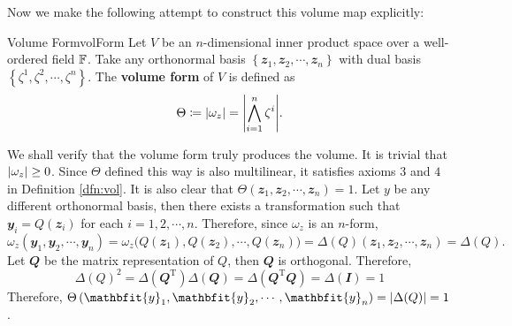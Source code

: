 \documentclass[math]{amznotes}
\theoremstyle{remark}
\newcommand{\I}{\mathbfit{I}}
\begin{document}
Now we make the following attempt to construct this volume map explicitly:
\begin{dfnbox}{Volume Form}{volForm}
    Let $V$ be an $n$-dimensional inner product space over a well-ordered field $\mathbb{F}$. Take any orthonormal basis $\left\{\mathbfit{z}_1, \mathbfit{z}_2, \cdots, \mathbfit{z}_n\right\}$ with dual basis $\left\{\zeta^1, \zeta^2, \cdots, \zeta^n\right\}$. The {\color{red} \textbf{volume form}} of $V$ is defined as 
    \begin{equation*}
        \Theta \coloneqq {\left\lvert {\omega_z} \right\rvert} = {\left\lvert {\bigwedge_{i = 1}^n\zeta^i} \right\rvert}.
    \end{equation*}
\end{dfnbox}
We shall verify that the volume form truly produces the volume. It is trivial that ${\left\lvert {\omega_z} \right\rvert} \geq 0$. Since $\Theta$ defined this way is also multilinear, it satisfies axioms $3$ and $4$ in Definition \ref{dfn:vol}. It is also clear that $\Theta\left(\mathbfit{z}_1, \mathbfit{z}_2, \cdots, \mathbfit{z}_n\right) = 1$. Let $y$ be any different orthonormal basis, then there exists a transformation such that $\mathbfit{y}_i = Q\left(\mathbfit{z}_i\right)$ for each $i = 1, 2, \cdots, n$. Therefore, since $\omega_z$ is an $n$-form,
\begin{equation*}
    \omega_z\left(\mathbfit{y}_1, \mathbfit{y}_2, \cdots, \mathbfit{y}_n\right) = \omega_z\bigl(Q\left(\mathbfit{z}_1\right), Q\left(\mathbfit{z}_2\right), \cdots, Q\left(\mathbfit{z}_n\right)\bigr) = \Delta(Q)\left(\mathbfit{z}_1, \mathbfit{z}_2, \cdots, \mathbfit{z}_n\right) = \Delta(Q).
\end{equation*}
Let $\mathbfit{Q}$ be the matrix representation of $Q$, then $\mathbfit{Q}$ is orthogonal. Therefore, 
\begin{equation*}
    \Delta(Q)^2 = \Delta\left(\mathbfit{Q}^{\mathrm{T}}\right)\Delta\left(\mathbfit{Q}\right) = \Delta\left(\mathbfit{Q}^{\mathrm{T}}\mathbfit{Q}\right) = \Delta\left(\I\right) = 1
\end{equation*}
Therefore, $\Theta\left(\mathbfit{y}_1, \mathbfit{y}_2, \cdots, \mathbfit{y}_n\right) = \abs{\Delta(Q)} = 1$.
\end{document}
